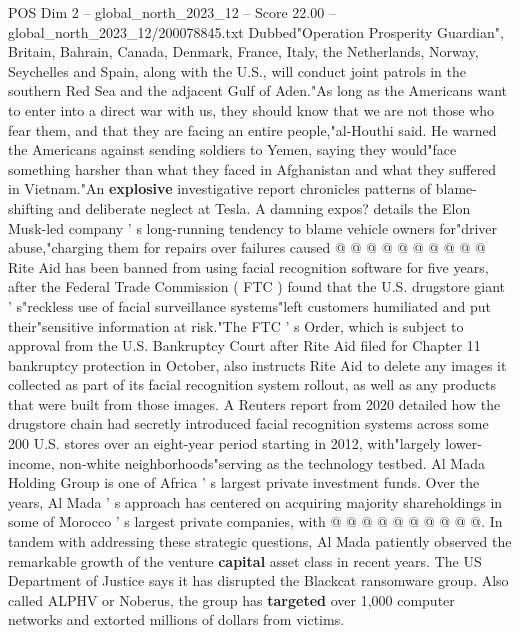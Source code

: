 \begin{textsample}{POS Dim 2 – global\_north\_2023\_12 – Score 22.00 – global\_north\_2023\_12/200078845.txt}
Dubbed"Operation Prosperity Guardian", Britain, Bahrain, Canada, Denmark, France, Italy, the Netherlands, Norway, Seychelles and Spain, along with the U.S., will conduct joint patrols in the southern Red Sea and the adjacent Gulf of Aden."As long as the Americans want to enter into a direct war with us, they should know that we are not those who fear them, and that they are facing an entire people,"al-Houthi said.
He warned the Americans against sending soldiers to Yemen, saying they would"face something harsher than what they faced in Afghanistan and what they suffered in Vietnam."An \textbf{explosive} investigative report chronicles patterns of blame-shifting and deliberate neglect at Tesla.
A damning expos? details the Elon Musk-led company ' s long-running tendency to blame vehicle owners for"driver abuse,"charging them for repairs over failures caused @ @ @ @ @ @ @ @ @ @ Rite Aid has been banned from using facial recognition software for five years, after the Federal Trade Commission ( FTC ) found that the U.S. drugstore giant ' s"reckless use of facial surveillance systems"left customers humiliated and put their"sensitive information at risk."The FTC ' s Order, which is subject to approval from the U.S.
Bankruptcy Court after Rite Aid filed for Chapter 11 bankruptcy protection in October, also instructs Rite Aid to delete any images it collected as part of its facial recognition system rollout, as well as any products that were built from those images.
A Reuters report from 2020 detailed how the drugstore chain had secretly introduced facial recognition systems across some 200 U.S. stores over an eight-year period starting in 2012, with"largely lower-income, non-white neighborhoods"serving as the technology testbed.
Al Mada Holding Group is one of Africa ' s largest private investment funds.
Over the years, Al Mada ' s approach has centered on acquiring majority shareholdings in some of Morocco ' s largest private companies, with @ @ @ @ @ @ @ @ @ @.
In tandem with addressing these strategic questions, Al Mada patiently observed the remarkable growth of the venture \textbf{capital} asset class in recent years.
The US Department of Justice says it has disrupted the Blackcat ransomware group.
Also called ALPHV or Noberus, the group has \textbf{targeted} over 1,000 computer networks and extorted millions of dollars from victims.

\end{textsample}
